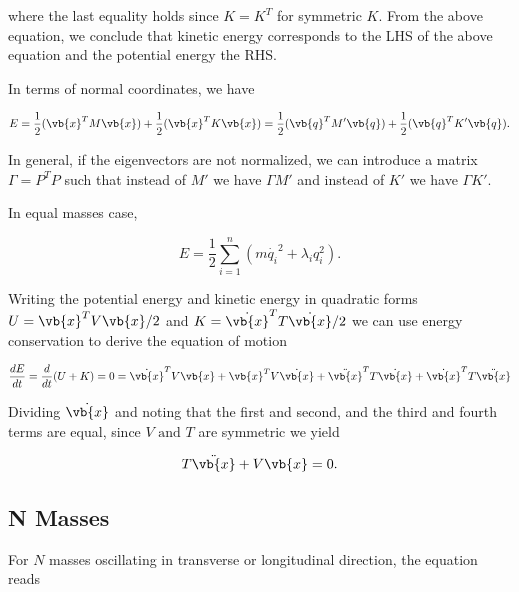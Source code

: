 \documentclass[a4paper,12pt]{report}
\begin{document}
where the last equality holds since \(K=K^T\) for symmetric \(K\). From the above equation, we conclude that kinetic energy corresponds to the LHS of the above equation and the potential energy the RHS.

In terms of normal coordinates, we have

\begin{equation}
    E = \frac{1}{2} (\vb{x} ^TM\vb{x}) + \frac{1}{2} (\vb{x} ^TK\vb{x}) =  \frac{1}{2}(\vb{q} ^TM'\vb{q} )+\frac{1}{2}(\vb{q} ^TK'\vb{q} ).
\end{equation}

In general, if the eigenvectors are not normalized, we can introduce a matrix \(\Gamma = P^TP\) such that instead of \(M'\) we have \(\Gamma M'\) and instead of \(K'\) we have \(\Gamma K'\).     

In equal masses case, 

\begin{equation}
    E = \frac{1}{2} \sum_{i=1}^{n} \left(  m \dot{q_{i} }^2+\lambda _{i}q_{i}^2     \right).
\end{equation}

Writing the potential energy and kinetic energy in quadratic forms \(U = \vb{x} ^T V \vb{x} /2\) and \(K = \dot{\vb{x} }  ^T T \dot{\vb{x} }  /2\) we can use energy conservation to derive the equation of motion

\begin{equation}
	\frac{dE}{dt} = \frac{d}{dt}(U+K) = 0 = \dot{\vb{x} }^TV \vb{x} + \vb{x} ^T V \dot{\vb{x} } + \ddot{\vb{x} }^T T \dot{\vb{x} }  + \dot{\vb{x} }  ^T T \ddot{\vb{x} }    
\end{equation}

Dividing \(\dot{\vb{x} } \) and noting that the first and second, and the third and fourth terms are equal, since \(V \text { and } T\) are symmetric we yield 

\begin{equation}
	T \ddot{\vb{x} } + V \vb{x} = 0.
\end{equation}




\subsection{N Masses}

For \(N\) masses oscillating in transverse or longitudinal direction, the equation reads 
\end{document}
